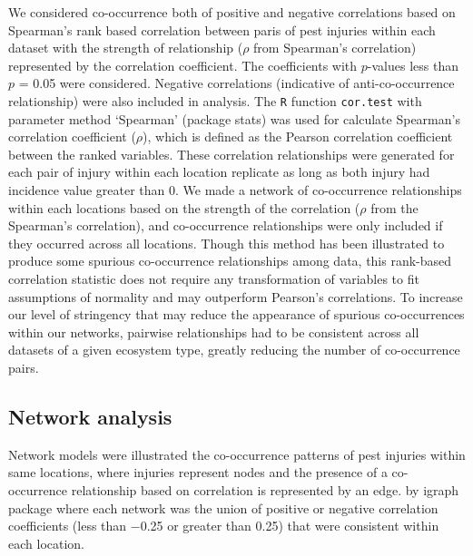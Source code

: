 \documentclass[a4paper]{article}
\begin{document}
We considered co-occurrence both of positive and negative correlations based on Spearman's rank based correlation between paris of pest injuries within each dataset with the strength of relationship ($\rho$ from Spearman's correlation) represented by the correlation coefficient. The coefficients with $p$-values less than $p$ = 0.05 were considered. Negative correlations (indicative of anti-co-occurrence relationship) were also included in analysis. The \texttt{R} function \texttt{cor.test} with parameter method `Spearman' (package stats) was used for calculate Spearman's correlation coefficient ($\rho$), which is defined as the Pearson correlation coefficient between the ranked variables.
These correlation relationships were generated for each pair of injury within each location replicate as long as both injury had incidence value greater than 0. We made a network of co-occurrence relationships within each locations based on the strength of the correlation ($\rho$ from the Spearman's correlation), and co-occurrence relationships were only included if they occurred across all locations. Though this method has been illustrated to produce some spurious co-occurrence relationships among data, this rank-based correlation statistic does not require any transformation of variables to fit assumptions of normality and may outperform Pearson’s correlations. To increase our level of stringency that may reduce the appearance of spurious co-occurrences within our networks, pairwise relationships had to be consistent across all datasets of a given ecosystem type, greatly reducing the number of co-occurrence pairs.


\subsection*{Network analysis}

Network models were illustrated the co-occurrence patterns of pest injuries within same locations, where injuries represent nodes and the presence of a co-occurrence relationship based on correlation is represented by an edge. by igraph package where each network was the union of positive or negative correlation coefficients (less than −0.25 or greater than 0.25) that were consistent within each location. 
\end{document}
